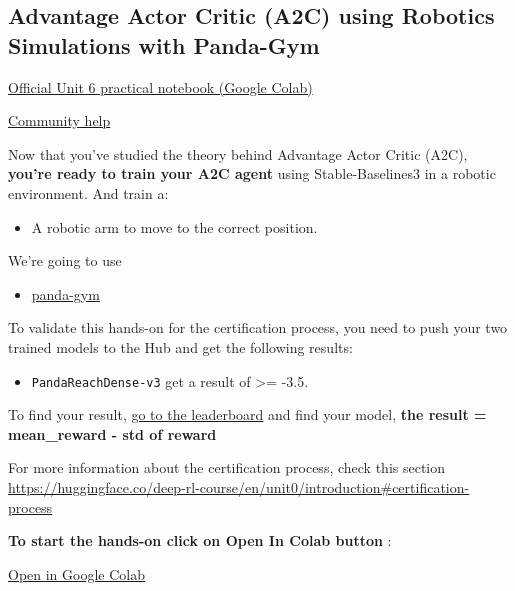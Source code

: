 \documentclass[11pt,a4paper]{article}
\begin{document}
\subsection{Advantage Actor Critic (A2C) using Robotics Simulations with Panda-Gym}\label{advantage-actor-critic-a2c-using-robotics-simulations-with-panda-gym}

\href{https://colab.research.google.com/github/huggingface/deep-rl-class/blob/main/notebooks/unit6/unit6.ipynb}{Official Unit 6 practical notebook (Google Colab)}

\href{http://hf.co/join/discord}{Community help}

Now that you've studied the theory behind Advantage Actor Critic (A2C), \textbf{you're ready to train your A2C agent} using Stable-Baselines3 in a robotic environment. And train a:

\begin{itemize}
\tightlist
\item
  A robotic arm to move to the correct position.
\end{itemize}

We're going to use

\begin{itemize}
\tightlist
\item
  \href{https://github.com/qgallouedec/panda-gym}{panda-gym}
\end{itemize}

To validate this hands-on for the certification process, you need to push your two trained models to the Hub and get the following results:

\begin{itemize}
\tightlist
\item
  \texttt{PandaReachDense-v3} get a result of \textgreater= -3.5.
\end{itemize}

To find your result, \href{https://huggingface.co/spaces/huggingface-projects/Deep-Reinforcement-Learning-Leaderboard}{go to the leaderboard} and find your model, \textbf{the result = mean\_reward - std of reward}

For more information about the certification process, check this section \url{https://huggingface.co/deep-rl-course/en/unit0/introduction#certification-process}

\textbf{To start the hands-on click on Open In Colab button} :

\href{https://colab.research.google.com/github/huggingface/deep-rl-class/blob/master/notebooks/unit6/unit6.ipynb}{Open in Google Colab}
\end{document}
